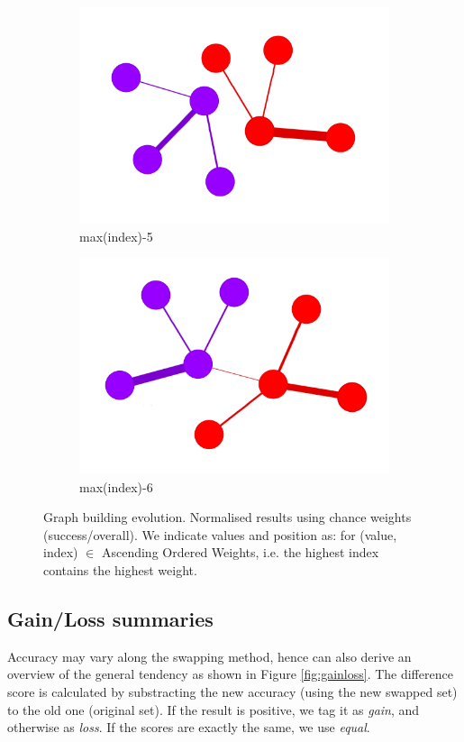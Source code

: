 \begin{figure}[!htb]
\begin{subfigure}[b]{0.13\linewidth}
		\includegraphics[width=\linewidth]{Minor Thesis/figures/graphs/sa/F.png}
		\caption{max(index)-5}
	\end{subfigure}
	\hfill
	\begin{subfigure}[b]{0.13\linewidth}
		\includegraphics[width=\linewidth]{Minor Thesis/figures/graphs/sa/G.png}
		\caption{max(index)-6}
	\end{subfigure}
	\caption{Graph building evolution. Normalised results using chance weights (success/overall). We indicate values and position as: for (value, index) $\in$ Ascending Ordered Weights, i.e. the highest index contains the highest weight.}
	\label{fig:graph-evo-sa}
\end{figure}

\subsection{Gain/Loss summaries}
Accuracy may vary along the swapping method, hence can also derive an overview of the general tendency as shown in Figure \ref{fig:gainloss}. The difference score is calculated by substracting the new accuracy (using the new swapped set) to the old one (original set). If the result is positive, we tag it as \emph{gain}, and otherwise as \emph{loss}. If the scores are exactly the same, we use \emph{equal}.

